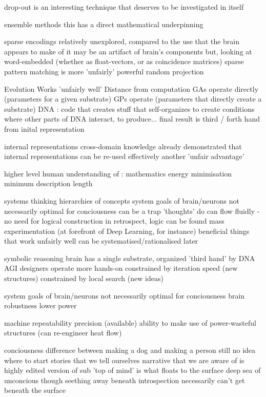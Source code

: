 \documentclass{llncs}
\begin{document}
drop-out is an interesting technique that deserves to be investigated in itself
  
ensemble methods
  this has a direct mathematical underpinning
  
sparse encodings
  relatively unexplored, compared to the use that the brain appears to make of it
    may be an artifact of brain's components
    but, looking at word-embedded (whether as float-vectors, or as coincidence matrices)
      sparse pattern matching is more 'unfairly' powerful 
      random projection

Evolution
  Works 'unfairly well'
  Distance from computation
    GAs operate directly (parameters for a given substrate)
    GPs operate (parameters that directly create a substrate)
    DNA : code that creates stuff that self-organizes to create conditions where 
      other parts of DNA interact, to produce...   
        final result is third / forth hand from inital representation

internal representations
  cross-domain knowledge
    already demonstrated that internal representations can be re-used effectively
    another 'unfair advantage'

higher level human understanding of :
  mathematics
    energy minimisation
    minimum description length
  
  systems thinking
    hierarchies of concepts
      system goals of brain/neurons not necessarily optimal for conciousness
    can be a trap 
      'thoughts' do can flow fluidly - no need for logical construction
        in retrospect, logic can be found
      mass experimentation (at forefront of Deep Learning, for instance) beneficial
        things that work unfairly well can be systematised/rationalised later

  symbolic reasoning
    brain has a single substrate, organized 'third hand' by DNA
    AGI designers operate more hands-on
      constrained by iteration speed (new structures)
      constrained by local search (new ideas)

system goals of brain/neurons not necessarily optimal for conciousness
  brain 
    robustness
    lower power
    
  machine
    repeatability
    precision (available)
    ability to make use of power-wasteful structures (can re-engineer heat flow)
    

conciousness
  difference between making a dog and making a person
  still no idea where to start
  stories that we tell ourselves
    narrative that we are aware of is highly edited version of sub
      'top of mind' is what floats to the surface
      deep sea of unconcious though seething away beneath
  introspection necessarily can't get beneath the surface
\end{document}

